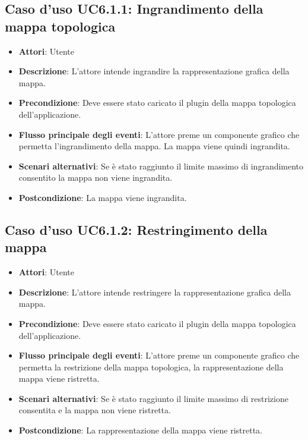 \subsection{Caso d'uso UC6.1.1: Ingrandimento della mappa topologica}
\begin{itemize}
\item \textbf{Attori}: Utente
\item \textbf{Descrizione}: L'attore intende ingrandire la rappresentazione grafica della mappa.
\item \textbf{Precondizione}: Deve essere stato caricato il plugin della mappa topologica dell'applicazione.
\item \textbf{Flusso principale degli eventi}: L'attore preme un componente grafico che permetta l'ingrandimento della mappa. La mappa viene quindi ingrandita.
\item \textbf{Scenari alternativi}: Se è stato raggiunto il limite massimo di ingrandimento consentito la mappa non viene ingrandita.
\item \textbf{Postcondizione}: La mappa viene ingrandita.
\end{itemize}
\subsection{Caso d'uso UC6.1.2: Restringimento della mappa}
\begin{itemize}
\item \textbf{Attori}: Utente
\item \textbf{Descrizione}: L'attore intende restringere la rappresentazione grafica della mappa.
\item \textbf{Precondizione}: Deve essere stato caricato il plugin della mappa topologica dell'applicazione.
\item \textbf{Flusso principale degli eventi}: L'attore preme un componente grafico che permetta la restrizione della mappa topologica, la rappresentazione della mappa viene ristretta.
\item \textbf{Scenari alternativi}: Se è stato raggiunto il limite massimo di restrizione consentita e la mappa non viene ristretta.
\item \textbf{Postcondizione}: La rappresentazione della mappa viene ristretta.
\end{itemize}
